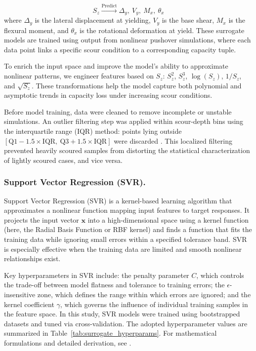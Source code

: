 \documentclass[authoryear,preprint,review,12pt]{elsarticle}
\begin{document}
\begin{equation}
S_z \xrightarrow{\text{Predict}} \Delta_y,\ V_y,\ M_x,\ \theta_x
\label{eq:sz_to_capacity}
\end{equation}
where $\Delta_y$ is the lateral displacement at yielding, $V_y$ is the base shear, $M_x$ is the flexural moment, and $\theta_x$ is the rotational deformation at yield. These surrogate models are trained using output from nonlinear pushover simulations, where each data point links a specific scour condition to a corresponding capacity tuple.

To enrich the input space and improve the model’s ability to approximate nonlinear patterns, we engineer features based on $S_z$: $S_z^2$, $S_z^3$, $\log(S_z)$, $1/S_z$, and $\sqrt{S_z}$. These transformations help the model capture both polynomial and asymptotic trends in capacity loss under increasing scour conditions.

Before model training, data were cleaned to remove incomplete or unstable simulations. An outlier filtering step was applied within scour-depth bins using the interquartile range (IQR) method: points lying outside $[\text{Q1} - 1.5 \times \text{IQR},\ \text{Q3} + 1.5 \times \text{IQR}]$ were discarded \citep{tukey1977exploratory}. This localized filtering prevented heavily scoured samples from distorting the statistical characterization of lightly scoured cases, and vice versa.



\subsubsection{Support Vector Regression (SVR).} 
Support Vector Regression (SVR) is a kernel-based learning algorithm that approximates a nonlinear function mapping input features to target responses. It projects the input vector $\bm{x}$ into a high-dimensional space using a kernel function (here, the Radial Basis Function or RBF kernel) and finds a function that fits the training data while ignoring small errors within a specified tolerance band. SVR is especially effective when the training data are limited and smooth nonlinear relationships exist.

Key hyperparameters in SVR include: the penalty parameter $C$, which controls the trade-off between model flatness and tolerance to training errors; the $\epsilon$-insensitive zone, which defines the range within which errors are ignored; and the kernel coefficient $\gamma$, which governs the influence of individual training samples in the feature space. In this study, SVR models were trained using bootstrapped datasets and tuned via cross-validation. The adopted hyperparameter values are summarized in Table~\ref{tab:surrogate_hyperparams}. For mathematical formulations and detailed derivation, see \citep{Smola2004SVR}.
\end{document}
